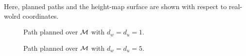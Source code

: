 			Here, planned paths and the height-map surface are shown with respect to real-wolrd coordinates.
				\begin{figure}
					\centering
					\caption{Path planned over ${\cal M}$ with $d_{w}=d_{u}=1$.}
					\label{fig::terrain_path_1}
				\end{figure}
				\begin{figure}
					\centering
					\caption{Path planned over ${\cal M}$ with $d_{w}=d_{u}=5$.}
					\label{fig::terrain_path_2}
				\end{figure}
